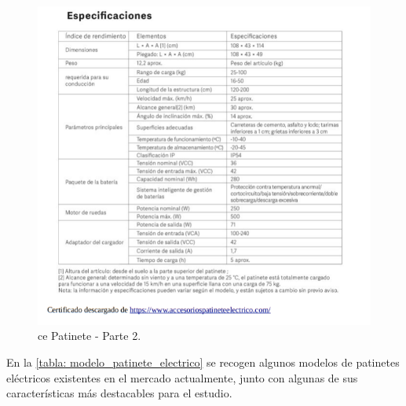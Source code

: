 \begin{figure}[H]
    \centering
    \includegraphics[scale=0.8]{archivos/CE patinete 2.png}
    \caption{\gls{ce} Patinete - Parte 2.}
    \label{fig:CE patinete 2}
\end{figure}

En la \autoref{tabla: modelo_patinete_electrico} se recogen algunos modelos de patinetes eléctricos existentes en el mercado actualmente, junto con algunas de sus características más destacables para el estudio.

